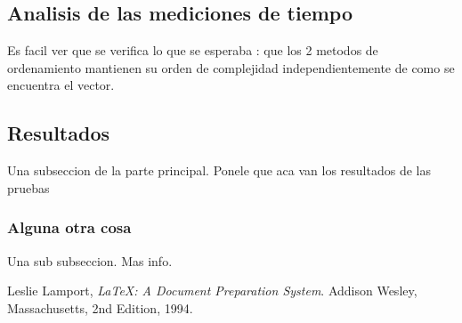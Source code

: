 \subsection{Analisis de las mediciones de tiempo}
Es facil ver que se verifica lo que se esperaba : que los 2 metodos de ordenamiento mantienen su orden de complejidad independientemente
de como se encuentra el vector.

\subsection{Resultados}
Una subseccion de la parte principal. Ponele que aca van los resultados de las pruebas

\subsubsection{Alguna otra cosa}
Una sub subseccion. Mas info.


\begin{thebibliography}{9}

	  Leslie Lamport,
	  \emph{\LaTeX: A Document Preparation System}.
	  Addison Wesley, Massachusetts,
	  2nd Edition,
	  1994.

\end{thebibliography}

          
